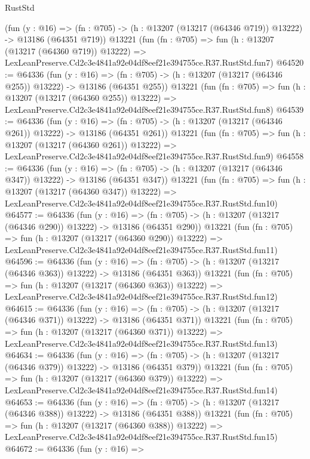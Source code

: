 \begin{lexlean}{RustStd}
\begin{coremodule}
    (fun (y : @16) =>
    (fn : @705) -> (h : @13207 (@13217 (@64346 @719)) @13222) -> @13186 (@64351 @719))
    @13221
    (fun (fn : @705) =>
    fun (h : @13207 (@13217 (@64360 @719)) @13222) =>
    LexLeanPreserve.Cd2c3e4841a92e04df8eef21e394755ce.R37.RustStd.fun7)
@64520 := @64336
    (fun (y : @16) =>
    (fn : @705) -> (h : @13207 (@13217 (@64346 @255)) @13222) -> @13186 (@64351 @255))
    @13221
    (fun (fn : @705) =>
    fun (h : @13207 (@13217 (@64360 @255)) @13222) =>
    LexLeanPreserve.Cd2c3e4841a92e04df8eef21e394755ce.R37.RustStd.fun8)
@64539 := @64336
    (fun (y : @16) =>
    (fn : @705) -> (h : @13207 (@13217 (@64346 @261)) @13222) -> @13186 (@64351 @261))
    @13221
    (fun (fn : @705) =>
    fun (h : @13207 (@13217 (@64360 @261)) @13222) =>
    LexLeanPreserve.Cd2c3e4841a92e04df8eef21e394755ce.R37.RustStd.fun9)
@64558 := @64336
    (fun (y : @16) =>
    (fn : @705) -> (h : @13207 (@13217 (@64346 @347)) @13222) -> @13186 (@64351 @347))
    @13221
    (fun (fn : @705) =>
    fun (h : @13207 (@13217 (@64360 @347)) @13222) =>
    LexLeanPreserve.Cd2c3e4841a92e04df8eef21e394755ce.R37.RustStd.fun10)
@64577 := @64336
    (fun (y : @16) =>
    (fn : @705) -> (h : @13207 (@13217 (@64346 @290)) @13222) -> @13186 (@64351 @290))
    @13221
    (fun (fn : @705) =>
    fun (h : @13207 (@13217 (@64360 @290)) @13222) =>
    LexLeanPreserve.Cd2c3e4841a92e04df8eef21e394755ce.R37.RustStd.fun11)
@64596 := @64336
    (fun (y : @16) =>
    (fn : @705) -> (h : @13207 (@13217 (@64346 @363)) @13222) -> @13186 (@64351 @363))
    @13221
    (fun (fn : @705) =>
    fun (h : @13207 (@13217 (@64360 @363)) @13222) =>
    LexLeanPreserve.Cd2c3e4841a92e04df8eef21e394755ce.R37.RustStd.fun12)
@64615 := @64336
    (fun (y : @16) =>
    (fn : @705) -> (h : @13207 (@13217 (@64346 @371)) @13222) -> @13186 (@64351 @371))
    @13221
    (fun (fn : @705) =>
    fun (h : @13207 (@13217 (@64360 @371)) @13222) =>
    LexLeanPreserve.Cd2c3e4841a92e04df8eef21e394755ce.R37.RustStd.fun13)
@64634 := @64336
    (fun (y : @16) =>
    (fn : @705) -> (h : @13207 (@13217 (@64346 @379)) @13222) -> @13186 (@64351 @379))
    @13221
    (fun (fn : @705) =>
    fun (h : @13207 (@13217 (@64360 @379)) @13222) =>
    LexLeanPreserve.Cd2c3e4841a92e04df8eef21e394755ce.R37.RustStd.fun14)
@64653 := @64336
    (fun (y : @16) =>
    (fn : @705) -> (h : @13207 (@13217 (@64346 @388)) @13222) -> @13186 (@64351 @388))
    @13221
    (fun (fn : @705) =>
    fun (h : @13207 (@13217 (@64360 @388)) @13222) =>
    LexLeanPreserve.Cd2c3e4841a92e04df8eef21e394755ce.R37.RustStd.fun15)
@64672 := @64336
    (fun (y : @16) =>

\end{coremodule}
\end{lexlean}
